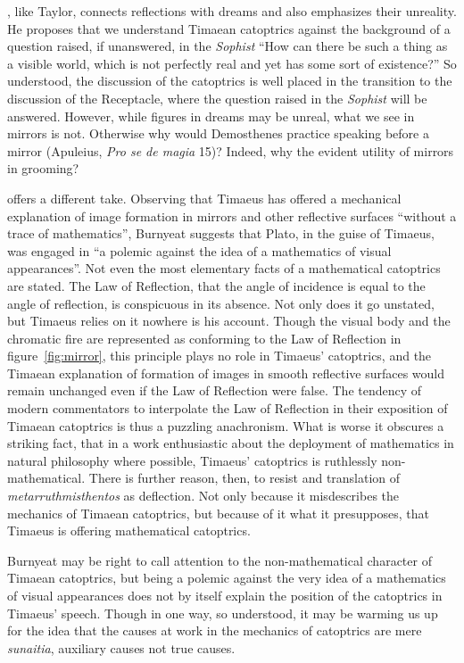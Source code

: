 \citet[156]{Cornford:1935fk}, like Taylor, connects reflections with dreams and also emphasizes their unreality. He proposes that we understand Timaean catoptrics against the background of a question raised, if unanswered, in the \emph{Sophist} ``How can there be such a thing as a visible world, which is not perfectly real and yet has some sort of existence?'' So understood, the discussion of the catoptrics is well placed in the transition to the discussion of the Receptacle, where the question raised in the \emph{Sophist} will be answered. However, while figures in dreams may be unreal, what we see in mirrors is not. Otherwise why would Demosthenes practice speaking before a mirror (Apuleius, \emph{Pro se de magia} 15)? Indeed, why the evident utility of mirrors in grooming? 

\citet[47--8]{Burnyeat:2005rc} offers a different take. Observing that Timaeus has offered a mechanical explanation of image formation in mirrors and other reflective surfaces ``without a trace of mathematics'', Burnyeat suggests that Plato, in the guise of Timaeus, was engaged in ``a polemic against the idea of a mathematics of visual appearances''. Not even the most elementary facts of a mathematical catoptrics are stated. The Law of Reflection, that the angle of incidence is equal to the angle of reflection, is conspicuous in its absence. Not only does it go unstated, but Timaeus relies on it nowhere is his account.  Though the visual body and the chromatic fire are represented as conforming to the Law of Reflection in figure~\ref{fig:mirror}, this principle plays no role in Timaeus' catoptrics, and the Timaean explanation of formation of images in smooth reflective surfaces would remain unchanged even if the Law of Reflection were false. The tendency of modern commentators to interpolate the Law of Reflection in their exposition of Timaean catoptrics is thus a puzzling anachronism. What is worse it obscures a striking fact, that in a work enthusiastic about the deployment of mathematics in natural philosophy where possible, Timaeus' catoptrics is ruthlessly non-mathematical. There is further reason, then, to resist \citet[159]{Archer-Hind:1888qd} and \citet[103]{Bury:1929jb} translation of \emph{metarruthmisthentos} as deflection. Not only because it misdescribes the mechanics of Timaean catoptrics, but because of it what it presupposes, that Timaeus is offering mathematical catoptrics.

Burnyeat may be right to call attention to the non-mathematical character of Timaean catoptrics, but being a polemic against the very idea of a mathematics of visual appearances does not by itself explain the position of the catoptrics in Timaeus' speech. Though in one way, so understood, it may be warming us up for the idea that the causes at work in the mechanics of catoptrics are mere \emph{sunaitia}, auxiliary causes not true causes.

